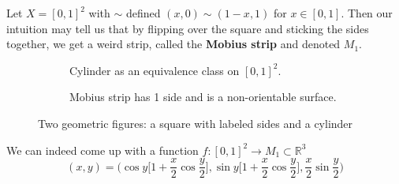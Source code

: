  \begin{example} 
    Let $X = [0, 1]^2$ with $\sim$ defined $(x, 0) \sim (1-x, 1)$ for $x \in [0, 1]$. Then our intuition may tell us that by flipping over the square and sticking the sides together, we get a weird strip, called the \textbf{Mobius strip} and denoted $M_1$.  

    \begin{figure}[H]
      \centering
      \begin{subfigure}[b]{0.48\textwidth}
        \centering
        \caption{Cylinder as an equivalence class on $[0, 1]^2$.}
        \label{fig:mobius_equiv}
      \end{subfigure}
      \hfill 
      \begin{subfigure}[b]{0.48\textwidth}
        \centering 
        \caption{Mobius strip has 1 side and is a non-orientable surface.} 
        \label{fig:mobius_strip_r3}
      \end{subfigure}
      \caption{Two geometric figures: a square with labeled sides and a cylinder}
      \label{fig:mobius_strip}
    \end{figure}

    We can indeed come up with a function $f: [0, 1]^2 \rightarrow M_1 \subset \mathbb{R}^3$ 
    \begin{equation}
      (x, y) = \bigg( \cos{y} \Big[ 1 + \frac{x}{2} \cos{\frac{y}{2}} \Big], \sin{y} \Big[ 1 + \frac{x}{2} \cos{\frac{y}{2}} \Big], \frac{x}{2} \sin \frac{y}{2} \bigg)
    \end{equation}
  \end{example}

